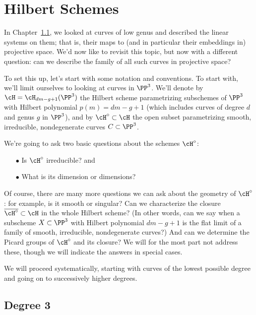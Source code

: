 

\chapter{Hilbert Schemes}
\label{HilbertSchemesChapter}

In Chapter~\ref{}, we looked at curves of low genus and described the linear systems on them; that is, their maps to (and in particular their embeddings in) projective space. We'd now like to revisit this topic, but now with a different question: can we describe the family of all such curves in projective space?

To set this up, let's start with some notation and conventions. To start with, we'll limit ourselves to looking at curves in $\PP^3$. We'll denote by $\cH = \cH_{dm-g+1}(\PP^3)$ the Hilbert scheme parametrizing subschemes of $\PP^3$ with Hilbert polynomial $p(m) = dm-g+1$ (which includes
curves of degree $d$ and genus $g$ in $\PP^3$), and by $\cH^\circ \subset \cH$ the open subset parametrizing smooth, irreducible, nondegenerate curves $C \subset \PP^3$. 

We're going to ask two basic questions about the schemes $\cH^\circ$:

\begin{enumerate}
\item[$\bullet$] Is $\cH^\circ$ irreducible? and
\item[$\bullet$]  What is its dimension or dimensions?
\end{enumerate}

Of course, there are many more questions we can ask about the geometry of $\cH^\circ$: for example, is it smooth or singular? Can we characterize the closure $\overline{\cH^\circ} \subset \cH$ in the whole Hilbert scheme? (In other words, can we say when a subscheme $X \subset \PP^3$ with Hilbert polynomial $dm-g+1$ is the flat limit of a family of smooth, irreducible, nondegenerate curves?) And can we determine the Picard groups of $\cH^\circ$ and its closure? We will for the most part not address these, though we will indicate the answers in special cases.

We will proceed systematically, starting with curves of the lowest possible degree and going on to successively higher degrees.

\section{Degree 3}

